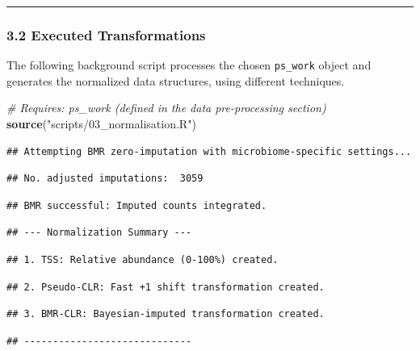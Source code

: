 \documentclass[
]{article}
\newenvironment{Shaded}{\begin{snugshade}}{\end{snugshade}}
\newcommand{\CommentTok}[1]{\textcolor[rgb]{0.56,0.35,0.01}{\textit{#1}}}
\newcommand{\FunctionTok}[1]{\textcolor[rgb]{0.13,0.29,0.53}{\textbf{#1}}}
\newcommand{\NormalTok}[1]{#1}
\newcommand{\StringTok}[1]{\textcolor[rgb]{0.31,0.60,0.02}{#1}}
\begin{document}
\begin{center}\rule{0.5\linewidth}{0.5pt}\end{center}

\subsubsection{3.2 Executed
Transformations}\label{executed-transformations}

The following background script processes the chosen \texttt{ps\_work}
object and generates the normalized data structures, using different
techniques.

\begin{Shaded}
\begin{Highlighting}[]
\CommentTok{\# Requires: ps\_work (defined in the data pre{-}processing section)}
\FunctionTok{source}\NormalTok{(}\StringTok{"scripts/03\_normalisation.R"}\NormalTok{)}
\end{Highlighting}
\end{Shaded}

\begin{verbatim}
## Attempting BMR zero-imputation with microbiome-specific settings...
\end{verbatim}

\begin{verbatim}
## No. adjusted imputations:  3059
\end{verbatim}

\begin{verbatim}
## BMR successful: Imputed counts integrated.
\end{verbatim}

\begin{verbatim}
## --- Normalization Summary ---
\end{verbatim}

\begin{verbatim}
## 1. TSS: Relative abundance (0-100%) created.
\end{verbatim}

\begin{verbatim}
## 2. Pseudo-CLR: Fast +1 shift transformation created.
\end{verbatim}

\begin{verbatim}
## 3. BMR-CLR: Bayesian-imputed transformation created.
\end{verbatim}

\begin{verbatim}
## -----------------------------
\end{verbatim}
\end{document}
